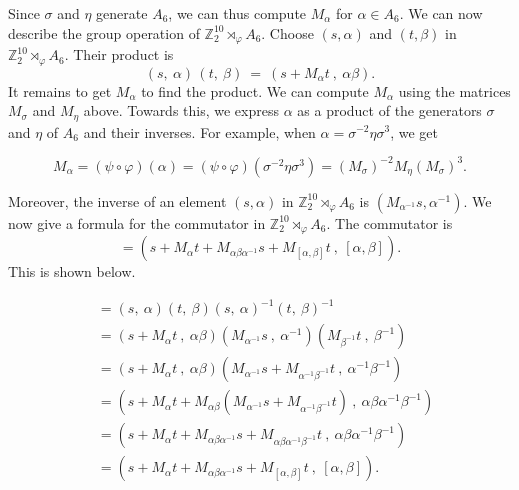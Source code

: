 \documentclass[10pt,leqno]{amsart}
\newcommand{\Z}{\mathbb{Z}}
\begin{document}
Since $\sigma$ and $\eta$ generate $A_6$, we can thus compute $M_\alpha$ for $\alpha \in A_6$. We can now describe the group operation of $\Z_2^{10} \rtimes_\varphi A_6$. Choose $(s,\alpha)$ and $(t,\beta)$ in $\mathbb{Z}_2^{10} \rtimes_\varphi A_6$. Their product is $$( s,\ \alpha )\,( t,\ \beta ) \ =\ ( s+M_{\alpha } t\ ,\ \alpha \beta ).$$ 
It remains to get $M_\alpha$ to find the product. We can compute $M_\alpha$ using the matrices $M_\sigma$ and $M_\eta$ above. Towards this, we express $\alpha$ as a product of the generators $\sigma$ and $\eta$ of $A_6$ and their inverses. For example, when $\alpha=\sigma^{-2}\eta\sigma^3$, we get

$$M_\alpha=(\psi\circ \varphi)(\alpha)=(\psi\circ \varphi)(\sigma^{-2}\eta\sigma^3)=(M_\sigma)^{-2} M_\eta (M_\sigma)^3.$$

Moreover, the inverse of an element $(s,\alpha)$ in $\mathbb{Z}_2^{10} \rtimes_\varphi A_6$ is $(M_{\alpha^{-1}}s, \alpha^{-1})$. We now give a formula for the commutator in $\mathbb{Z}_2^{10} \rtimes_\varphi A_6$. The commutator is  
\begin{equation}
[( s ,\ \alpha )\ ,\ ( t,\ \beta )]=(s+M_\alpha t+M_{\alpha\beta\alpha^{-1}}s+M_{[\alpha,\beta]}t\ ,\ [\alpha,\beta]).
\end{equation}
This is shown below. 

\begin{align*}
[( s,\ \alpha )\ ,\ ( t,\ \beta )] &= (s,\ \alpha )( t,\ \beta )( s,\ \alpha )^{-1} ( t,\ \beta )^{-1}   \nonumber\\
 &= (s+M_\alpha t\ ,\ \alpha\beta )( M_{\alpha^{-1}}s\ ,\ \alpha ^{-1}) ( M_{\beta^{-1}}t\ ,\ \beta ^{-1})   \nonumber\\
 &= (s+M_\alpha t\ ,\ \alpha\beta )( M_{\alpha^{-1}}s+M_{\alpha^{-1}\beta^{-1}}t\ ,\ \alpha ^{-1}\beta ^{-1})   \nonumber\\
 &= (s+M_\alpha t+M_{\alpha\beta}(M_{\alpha^{-1}}s+M_{\alpha^{-1}\beta^{-1}}t)\ ,\ \alpha\beta \alpha ^{-1}\beta ^{-1})   \nonumber\\
 &= (s+M_\alpha t+M_{\alpha\beta\alpha^{-1}}s+M_{\alpha\beta\alpha^{-1}\beta^{-1}}t\ ,\ \alpha\beta \alpha ^{-1}\beta ^{-1})   \nonumber\\
 &= (s+M_\alpha t+M_{\alpha\beta\alpha^{-1}}s+M_{[\alpha,\beta]}t\ ,\ [\alpha,\beta]).   
\end{align*}
\end{document}
